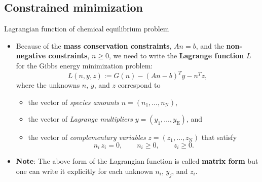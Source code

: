 \subsection{Constrained minimization}
%
\begin{frame}{Lagrangian function of chemical equilibrium problem}
\begin{itemize}
\item Because of the {\bf mass conservation constraints}, $An=b$, and
the {\bf non-negative constraints}, $n\geq0$, we need to write
the \alert{\textbf{Lagrange function}} $L$ for the Gibbs energy minimization problem:
\[
L(n,y,z):=G(n)-(An-b)^{T}y-n^{T}z,
\]
where the \alert{unknowns} $n$, $y$, and $z$ correspond to
%
\begin{itemize}
\item the vector of \emph{species amounts} $n=(n_{1},\ldots,n_{\text{N}})$, 
\item the vector of \emph{Lagrange multipliers} $y=(y_{1},\ldots,y_{\text{E}})$, and 
\item the vector of \emph{complementary variables} $z=(z_{1},\ldots,z_{\text{N}})$ that satisfy 
%	
\[
n_{i}\, z_{i}=0,\qquad n_{i}\geq0,\qquad z_{i}\geq0.
\]
\end{itemize}

\item {\bf Note}: The above form of the Lagrangian function is called {\bf matrix form} but one can write it explicitly for each unknown $n_{i}$, $y_{j}$, and $z_{i}$. 
\end{itemize}
\end{frame}
%
%
